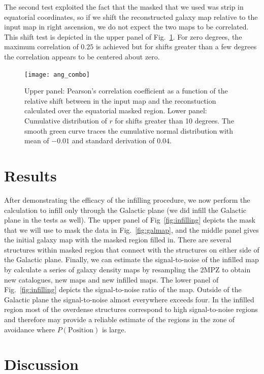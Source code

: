 \documentclass[useAMS,usenatbib]{mn2e}
\begin{document}
The second test exploited the fact that the masked that we used was
strip in equatorial coordinates, so if we shift the reconstructed
galaxy map relative to the input map in right ascension, we do not
expect the two maps to be correlated.  This shift test is depicted in
the upper panel of Fig.~\ref{fig:shift_test}.  For zero degrees, the
maximum correlation of $0.25$ is achieved but for shifts greater than
a few degrees the correlation appears to be centered about zero.
\begin{figure}
  \texttt{[image: ang\_combo]}
  \caption{Upper panel: Pearson's correlation coefficient as a
    function of the relative shift between in the input map and the
    reconstuction calculated over the equatorial masked region. Lower
    panel: Cumulative distribution of $r$ for shifts greater than 10
    degrees.  The smooth green curve traces the cumulative normal
    distribution with mean of $-0.01$ and standard derivation of
    $0.04$.}
  \label{fig:shift_test}
\end{figure}

\section{Results}

After demonstrating the efficacy of the infilling procedure, we now
perform the calculation to infill only through the Galactic plane (we did
infill the Galactic plane in the tests as well).  The upper panel of
Fig~\ref{fig:infilling} depicts the mask that we will use to mask the
data in Fig.~\ref{fig:galmap}, and the middle panel gives the initial
galaxy map with the masked region filled in.  There are several
structures within masked region that connect with the structures on either
side of the Galactic plane.  Finally, we can estimate the
signal-to-noise of the infilled map by calculate a series of galaxy
density maps by resampling the 2MPZ to obtain new catalogues, new maps
and new infilled maps.  The lower panel of Fig.~\ref{fig:infilling}
depicts the signal-to-noise ratio of the map.  Outside of the Galactic
plane the signal-to-noise almost everywhere exceeds four.  In the
infilled region most of the overdense structures correspond to high
signal-to-noise regions and therefore may provide a reliable estimate
of the regions in the zone of avoidance where $P(\mathrm{Position})$
is large.


\section{Discussion}





\label{lastpage}
\end{document}
